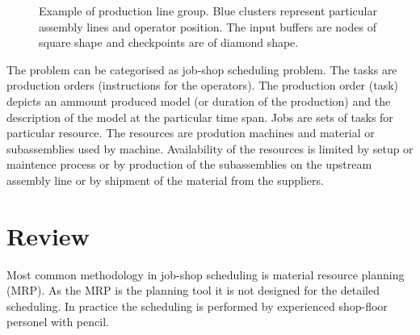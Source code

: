 \documentclass[a4paper,journal,onecolumn]{IEEEtran}
\begin{document}
\begin{figure}[h]%
  \centering
  \caption{Example of production line group. Blue clusters represent particular assembly lines
  and operator position. 
  The input buffers are nodes of square shape and checkpoints are of diamond shape.}
  \label{fig:graph}
\end{figure}

The problem can be categorised as job-shop scheduling problem. The tasks are production orders (instructions for the operators).
The production order (task) depicts an ammount produced model (or duration of the production) and the description of the model
at the particular time span.
Jobs are sets of tasks for particular resource.
The resources are prodution machines and material or subassemblies used by machine.
Availability of the resources is limited by setup or maintence process or by production of the subassemblies
on the upstream assembly line or by shipment of the material from the suppliers.

\section{Review}
Most common methodology in job-shop scheduling is material resource planning (MRP). As the MRP is the planning tool it
is not designed for the detailed scheduling. In practice the scheduling is performed by experienced shop-floor
personel with pencil. \cite{Hoi} 
\end{document}
